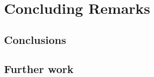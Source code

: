 \chapter{Concluding Remarks}
\label{cha:conclusions}

\section{Conclusions}


\section{Further work}
\label{sec:conclusions:furtherwork}
